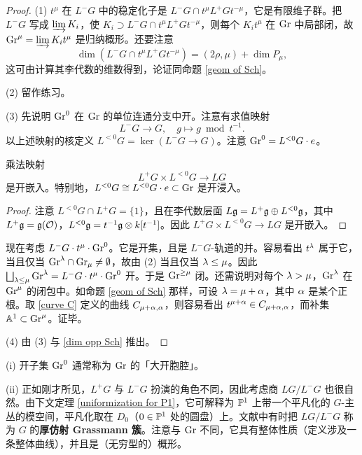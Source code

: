 \begin{proof}
(1) $t^\mu$ 在 $L^-G$ 中的稳定化子是 $L^-G\cap t^\mu L^+G t^{-\mu}$，它是有限维子群。把 $L^-G$ 写成 $\varinjlim K_i$，使 $K_i\supset L^-G\cap t^\mu L^+G t^{-\mu}$，则每个 $K_it^\mu$ 在 ${\operatorname{Gr}}$ 中局部闭，故 ${\operatorname{Gr}}^\mu=\varinjlim K_it^\mu$ 是归纳概形。还要注意
\begin{equation}\label{dim opp Sch}
\dim(L^-G\cap t^\mu L^+G t^{-\mu})=(2\rho,\mu)+\dim P_\mu,
\end{equation}
这可由计算其李代数的维数得到，论证同命题 \ref{geom of Sch}。

(2) 留作练习。

(3) 先说明 ${\operatorname{Gr}}^0$ 在 ${\operatorname{Gr}}$ 的单位连通分支中开。注意有求值映射
\[L^-G\to G,\quad g\mapsto g\bmod t^{-1}.\]
以上述映射的核定义 $L^{<0}G=\ker(L^-G\to G)$。注意 ${\operatorname{Gr}}^0= L^{<0}G\cdot e$。

\begin{lem}\label{big cell}
乘法映射
\[L^{+}G\times L^{<0}G\to LG\]
是开嵌入。特别地，$L^{<0}G\cong L^{<0}G\cdot e\subset {\operatorname{Gr}}$ 是开浸入。
\end{lem}

\begin{proof}
注意 $L^{<0}G\cap L^+G=\{1\}$，且在李代数层面 $L{\mathfrak g}=L^+{\mathfrak g}\oplus L^{<0}{\mathfrak g}$，其中 $L^+{\mathfrak g}={\mathfrak g}({\mathcal O})$，$L^{<0}{\mathfrak g}=t^{-1}{\mathfrak g}\otimes k[t^{-1}]$。因此 $L^{+}G\times L^{<0}G\to LG$ 是开嵌入。
\end{proof}

现在考虑 $L^-G\cdot t^\mu\cdot {\operatorname{Gr}}^0$。它是开集，且是 $L^-G$-轨道的并。容易看出 $t^{\lambda}$ 属于它，当且仅当 ${\operatorname{Gr}}^{\lambda}\cap {\operatorname{Gr}}_\mu\neq \emptyset$，故由 (2) 当且仅当 ${\lambda}\leq \mu$。因此 $\bigsqcup_{{\lambda}\leq \mu}{\operatorname{Gr}}^{\lambda}=L^-G\cdot t^\mu \cdot {\operatorname{Gr}}^0$ 开。于是 ${\operatorname{Gr}}^{\geq \mu}$ 闭。还需说明对每个 ${\lambda}>\mu$，${\operatorname{Gr}}^{\lambda}$ 在 ${\operatorname{Gr}}^\mu$ 的闭包中。如命题 \ref{geom of Sch} 那样，可设 ${\lambda}=\mu+{\alpha}$，其中 ${\alpha}$ 是某个正根。取 \eqref{curve C} 定义的曲线 $C_{\mu+{\alpha},{\alpha}}$，则容易看出 $t^{\mu+{\alpha}}\in C_{\mu+{\alpha},{\alpha}}$，而补集 ${\mathbb A}^1\subset {\operatorname{Gr}}^\mu$。证毕。

(4) 由 (3) 与 \eqref{dim opp Sch} 推出。
\end{proof}

\begin{rmk}
(i) 开子集 ${\operatorname{Gr}}^0$ 通常称为 ${\operatorname{Gr}}$ 的「大开胞腔」。

(ii) 正如刚才所见，$L^+G$ 与 $L^-G$ 扮演的角色不同，因此考虑商 $LG/L^-G$ 也很自然。由下文定理 \ref{uniformization for P1}，它可解释为 ${\mathbb P}^1$ 上带一个平凡化的 $G$-主丛的模空间，平凡化取在 $D_0$（$0\in {\mathbb P}^1$ 处的圆盘）上。文献中有时把 $LG/L^-G$ 称为 $G$ 的\textbf{厚仿射 Grassmann 簇}。注意与 ${\operatorname{Gr}}$ 不同，它具有整体性质（定义涉及一条整体曲线），并且是（无穷型的）概形。
\end{rmk}

